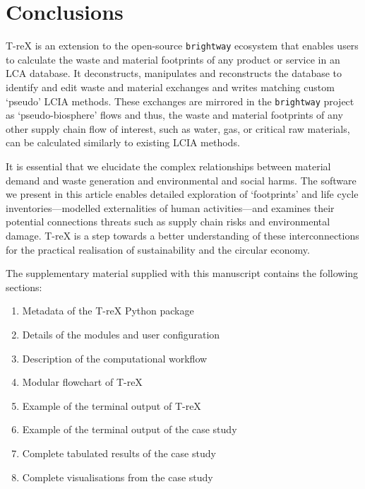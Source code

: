 \documentclass[a4paper,fleqn]{cas-dc}
\begin{document}
\section{Conclusions}\label{sec:conclusions}

T-reX is an extension to the open-source \texttt{brightway} ecosystem that
enables users to calculate the waste and material footprints of any product or
service in an LCA database. It  deconstructs, manipulates and reconstructs the
database to identify and edit waste and material exchanges and writes matching
custom `pseudo' LCIA methods. These exchanges are mirrored in the
\texttt{brightway} project as `pseudo-biosphere' flows and thus, the waste and
material footprints of any other supply chain flow of interest, such as water,
gas, or critical raw materials, can be calculated similarly to existing LCIA
methods.


It is essential that we elucidate the complex relationships between material 
demand and waste  generation and environmental  and social harms. The software we
present in this article enables detailed exploration of `footprints' and life
cycle inventories---modelled externalities of human activities---and examines
their potential connections  threats such as supply chain risks and 
environmental damage. T-reX is a step towards a better understanding of these
interconnections for the practical realisation of  sustainability and the 
circular economy.

\appendix
The supplementary material supplied with this manuscript contains the
following sections:
\begin{enumerate}
	\item Metadata of the T-reX Python package\label{sec:supplementary-1}
	\item Details of the modules and user configuration\label{sec:supplementary-2}
	\item Description of the computational workflow\label{sec:supplementary-3}
	\item Modular flowchart of T-reX\label{sec:supplementary-4}
	\item Example of the terminal output of T-reX\label{sec:supplementary-5}
	\item Example of the terminal output of the case study\label{sec:supplementary-6}
	\item Complete tabulated results of the case study\label{sec:supplementary-7}
	\item Complete visualisations from the case study\label{sec:supplementary-8}
\end{enumerate}
\end{document}
